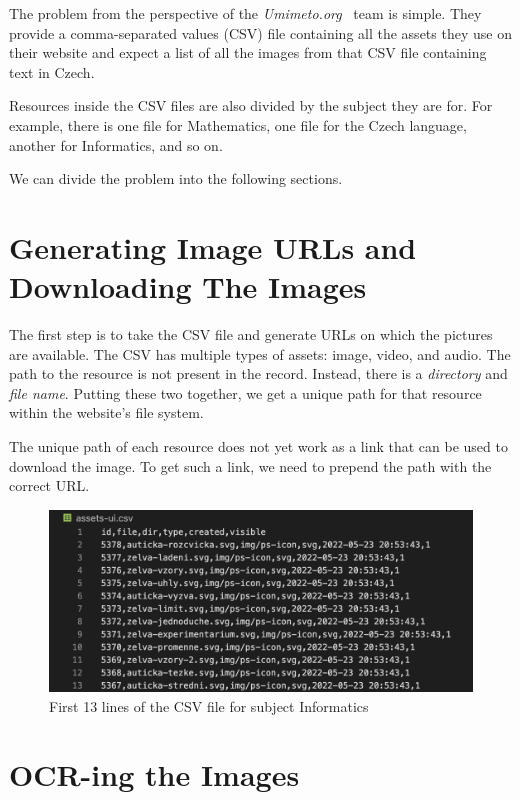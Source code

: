 \documentclass[
  digital,     %
  oneside,     %
  nosansbold,  %
  nocolorbold, %
  nolof,         %
  nolot,         %
]{fithesis4}
\begin{document}
The problem from the perspective of the \emph{Umimeto.org}~\cite{umimeto} team is simple. They provide a comma-separated values (CSV) file containing all the assets they use on their website and expect a list of all the images from that CSV file containing text in Czech.

Resources inside the CSV files are also divided by the subject they are for. For example, there is one file for
Mathematics, one file for the Czech language, another for Informatics, and so on.

We can divide the problem into the following sections.

\section{Generating Image URLs and Downloading The Images}

The first step is to take the CSV file and generate URLs on which the pictures are available. The CSV has multiple types of assets: image, video, and audio. The path to the resource is not present in the record. Instead, there is a \emph{directory} and \emph{file name}. Putting these two together, we get a unique path for that resource within the website's file system.

The unique path of each resource does not yet work as a link that can be used to download the image. To get such a link, we need to prepend the path with the correct URL.

\begin{figure}[h]
\includegraphics[width=\textwidth]{images/assets-ui-csv.png}
\centering
\caption{First 13 lines of the CSV file for subject Informatics}
\end{figure}

\section{OCR-ing the Images}
\end{document}

